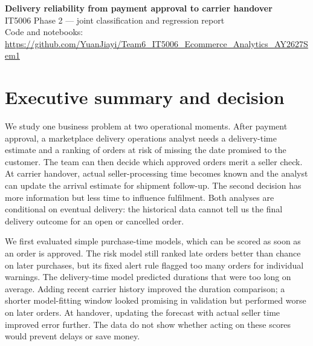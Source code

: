 \documentclass[12pt,a4paper]{article}
\begin{document}
\begin{center}
{\Large\bfseries Delivery reliability from payment approval to carrier handover}\\[3pt]
{\small IT5006 Phase 2 --- joint classification and regression report}\\[2pt]
{\footnotesize Code and notebooks: \url{https://github.com/YuanJiayi/Team6_IT5006_Ecommerce_Analytics_AY2627Sem1}}
\end{center}
\vspace{-0.5em}

\section*{Executive summary and decision}
We study one business problem at two operational moments. After payment approval, a marketplace delivery operations analyst needs a delivery-time estimate and a ranking of orders at risk of missing the date promised to the customer. The team can then decide which approved orders merit a seller check. At carrier handover, actual seller-processing time becomes known and the analyst can update the arrival estimate for shipment follow-up. The second decision has more information but less time to influence fulfilment. Both analyses are conditional on eventual delivery: the historical data cannot tell us the final delivery outcome for an open or cancelled order.

We first evaluated simple purchase-time models, which can be scored as soon as an order is approved. The risk model still ranked late orders better than chance on later purchases, but its fixed alert rule flagged too many orders for individual warnings. The delivery-time model predicted durations that were too long on average. Adding recent carrier history improved the duration comparison; a shorter model-fitting window looked promising in validation but performed worse on later orders. At handover, updating the forecast with actual seller time improved error further. The data do not show whether acting on these scores would prevent delays or save money.
\end{document}
